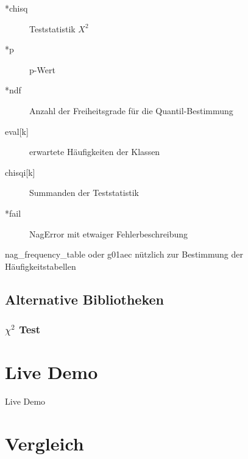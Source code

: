 \documentclass{beamer}
\begin{document}
\begin{frame}{\insertsubsection}
\begin{definition}[Ausgabeparameter]
	\begin{description}
	\item[*chisq] Teststatistik $X^2$
	\item[*p] p-Wert
	\item[*ndf] Anzahl der Freiheitsgrade für die Quantil-Bestimmung
	\item[eval{[k]}] erwartete Häufigkeiten der Klassen
	\item[chisqi{[k]}] Summanden der Teststatistik
	\item[*fail] NagError mit etwaiger Fehlerbeschreibung
	\end{description}
\end{definition}
\begin{block}{nag\_frequency\_table oder g01aec}
	nützlich zur Bestimmung der Häufigkeitstabellen
\end{block}
\end{frame}

\subsection{Alternative Bibliotheken}
\begin{frame}
\frametitle{$\chi^2$ Test}
\end{frame}

\section{Live Demo}

\begin{frame}{\insertsection}
\center
\Huge Live Demo
\end{frame}

\section{Vergleich}
\end{document}
